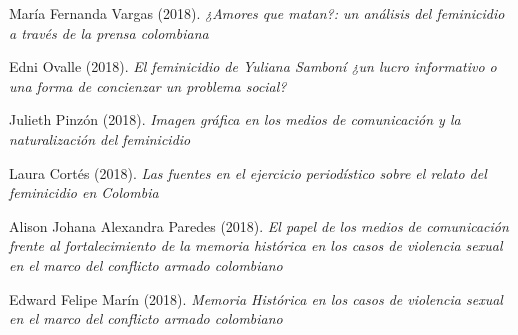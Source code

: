 \documentclass[11pt,a4paper,]{awesome-cv}
\begin{document}
\begin{cventries}
{\begin{cvitems}
\item María Fernanda Vargas (2018). \textit{¿Amores que matan?: un análisis del feminicidio a través de la prensa colombiana}
\item Edni Ovalle (2018). \textit{El feminicidio de Yuliana Samboní ¿un lucro informativo o una forma de concienzar un problema social?}
\item Julieth Pinzón (2018). \textit{Imagen gráfica en los medios de comunicación y la naturalización del feminicidio}
\item Laura Cortés (2018). \textit{Las fuentes en el ejercicio periodístico sobre el relato del feminicidio en Colombia}
\item Alison Johana Alexandra Paredes (2018). \textit{El papel de los medios de comunicación frente al fortalecimiento de la memoria histórica en los casos de violencia sexual en el marco del conflicto armado colombiano}
\item Edward Felipe Marín (2018). \textit{Memoria Histórica en los casos de violencia sexual en el marco del conflicto armado colombiano}
\end{cvitems}}
\end{cventries}
\end{document}
